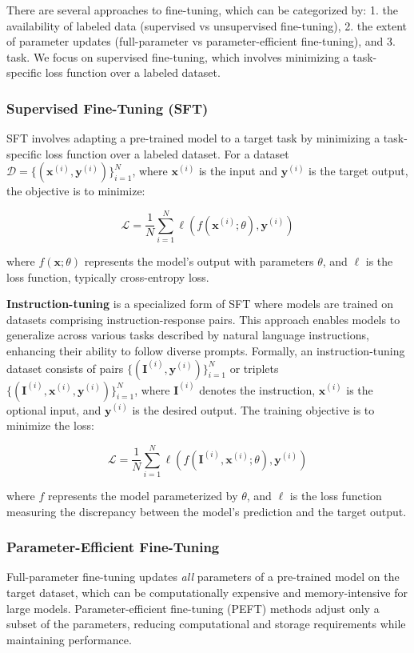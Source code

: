 \documentclass[11pt]{article}
\begin{document}
There are several approaches to fine-tuning, which can be categorized by: 1. the availability of labeled data (supervised vs unsupervised fine-tuning), 2. the extent of parameter updates (full-parameter vs parameter-efficient fine-tuning), and 3. task. We focus on supervised fine-tuning, which involves minimizing a task-specific loss function over a labeled dataset.

\subsubsection{Supervised Fine-Tuning (SFT)}\label{app:sft}

SFT involves adapting a pre-trained model to a target task by minimizing a task-specific loss function over a labeled dataset. For a dataset \( \mathcal{D} = \{(\mathbf{x}^{(i)}, \mathbf{y}^{(i)})\}_{i=1}^N \), where \( \mathbf{x}^{(i)} \) is the input and \( \mathbf{y}^{(i)} \) is the target output, the objective is to minimize:

\[
\mathcal{L} = \frac{1}{N} \sum_{i=1}^N \ell(f(\mathbf{x}^{(i)}; \theta), \mathbf{y}^{(i)})
\]

where \( f(\mathbf{x}; \theta) \) represents the model's output with parameters \( \theta \), and \( \ell \) is the loss function, typically cross-entropy loss.

\textbf{Instruction-tuning} is a specialized form of SFT where models are trained on datasets comprising instruction-response pairs. This approach enables models to generalize across various tasks described by natural language instructions, enhancing their ability to follow diverse prompts. Formally, an instruction-tuning dataset consists of pairs \( \{(\mathbf{I}^{(i)}, \mathbf{y}^{(i)})\}_{i=1}^N \) or triplets \( \{(\mathbf{I}^{(i)}, \mathbf{x}^{(i)}, \mathbf{y}^{(i)})\}_{i=1}^N \), where \( \mathbf{I}^{(i)} \) denotes the instruction, \( \mathbf{x}^{(i)} \) is the optional input, and \( \mathbf{y}^{(i)} \) is the desired output. The training objective is to minimize the loss:

\[
\mathcal{L} = \frac{1}{N} \sum_{i=1}^N \ell(f(\mathbf{I}^{(i)}, \mathbf{x}^{(i)}; \theta), \mathbf{y}^{(i)})
\]

where \( f \) represents the model parameterized by \( \theta \), and \( \ell \) is the loss function measuring the discrepancy between the model's prediction and the target output.

\subsubsection{Parameter-Efficient Fine-Tuning} \label{app:peft}
Full-parameter fine-tuning updates \textit{all} parameters of a pre-trained model on the target dataset, which can be computationally expensive and memory-intensive for large models. Parameter-efficient fine-tuning (PEFT) methods adjust only a subset of the parameters, reducing computational and storage requirements while maintaining performance.
\end{document}

